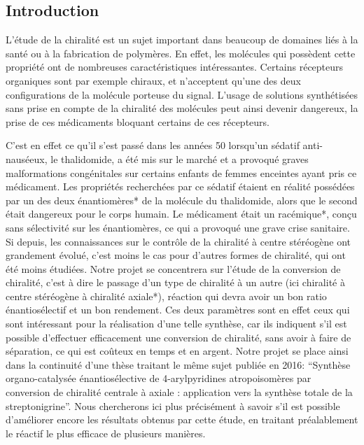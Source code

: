 \documentclass{article}
\begin{document}
\newpage
\begin{center}
\section*{Introduction}
\end{center}
\bigskip
\bigskip\bigskip
L’étude de la chiralité est un sujet important dans beaucoup de domaines liés à la santé ou à la fabrication de polymères. En effet, les molécules qui possèdent cette propriété ont de nombreuses caractéristiques intéressantes. Certains récepteurs organiques sont par exemple chiraux, et n’acceptent qu’une des deux configurations de la molécule porteuse du signal. L’usage de solutions synthétisées sans prise en compte de la chiralité des molécules peut ainsi devenir dangereux, la prise de ces médicaments bloquant certains de ces récepteurs.\par
\bigbreak
C’est en effet ce qu’il s’est passé dans les années 50 lorsqu’un sédatif anti-nauséeux, le thalidomide, a été mis sur le marché et a provoqué graves malformations congénitales sur certains enfants de femmes enceintes ayant pris ce médicament. Les propriétés recherchées par ce sédatif étaient en réalité possédées par un des deux énantiomères* de la molécule du thalidomide, alors que le second était dangereux pour le corps humain. Le médicament était un racémique*, conçu sans sélectivité sur les énantiomères, ce qui a provoqué une grave crise sanitaire. Si depuis, les connaissances sur le contrôle de la chiralité à centre stéréogène ont grandement évolué, c'est moins le cas pour d'autres formes de chiralité, qui ont été moins étudiées.
\bigbreak
Notre projet se concentrera sur l’étude de la conversion de chiralité, c’est à dire le passage d’un type de chiralité à un autre (ici chiralité à centre stéréogène à chiralité axiale*), réaction qui devra avoir un bon ratio énantiosélectif et un bon rendement. Ces deux paramètres sont en effet ceux qui sont intéressant pour la réalisation d’une telle synthèse, car ils indiquent s’il est possible d'effectuer efficacement une conversion de chiralité, sans avoir à faire de séparation, ce qui est coûteux en temps et en argent.
\bigbreak
Notre projet se place ainsi dans la continuité d’une thèse traitant le même sujet publiée en 2016: “Synthèse organo-catalysée énantiosélective de 4-arylpyridines atropoisomères par conversion de chiralité centrale à axiale : application vers la synthèse totale de la streptonigrine”. Nous chercherons ici plus précisément à savoir s’il est possible d’améliorer encore les résultats obtenus par cette étude, en traitant préalablement le réactif le plus efficace de plusieurs manières.
\end{document}
